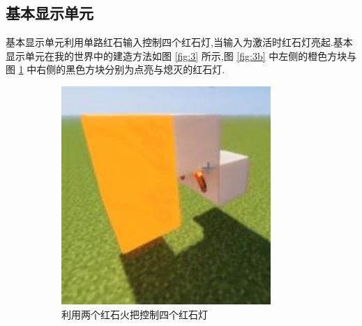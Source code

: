 \documentclass[UTF8,12pt,punct=kaiming,fontset=none]{article}
\begin{document}
    \subsection{基本显示单元}
    基本显示单元利用单路红石输入控制四个红石灯,当输入为激活时红石灯亮起.基本显示单元在我的世界中的建造方法如图 \ref{fig:3} 所示,图 \ref{fig:3b} 中左侧的橙色方块与图 \ref{fig:3a} 中右侧的黑色方块分别为点亮与熄灭的红石灯.

    \begin{figure}[H]
        \centering
        \begin{subfigure}{0.2\linewidth}
            \centering
            \includegraphics[width=\linewidth]{figures/3a.png}
            \caption{利用两个红石火把控制四个红石灯}
            \label{fig:3a}
        \end{subfigure}
        \hspace{1cm}
        \begin{subfigure}{0.25\linewidth}
            \centering

\end{subfigure}
\end{figure}
\end{document}
